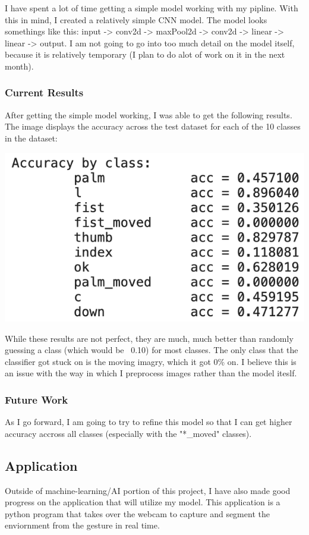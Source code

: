 \documentclass[9pt]{article}
\begin{document}
I have spent a lot of time getting a simple model working with my pipline. With this in mind, I created a relatively simple CNN model. The model looks somethings like this: input -> conv2d -> maxPool2d -> conv2d -> linear -> linear -> output. I am not going to go into too much detail on the model itself, because it is relatively temporary (I plan to do alot of work on it in the next month).

\subsubsection{Current Results}

After getting the simple model working, I was able to get the following results. The image displays the accuracy across the test dataset for each of the 10 classes in the dataset:

\includegraphics{curr_results}

While these results are not perfect, they are much, much better than randomly guessing a class (which would be ~0.10) for most classes. The only class that the classifier got stuck on is the moving imagry, which it got 0\% on. I believe this is an issue with the way in which I preprocess images rather than the model iteslf.

\subsubsection{Future Work}
As I go forward, I am going to try to refine this model so that I can get higher accuracy accross all classes (especially with the "*\_moved" classes).

\subsection{Application}
Outside of machine-learning/AI portion of this project, I have also made good progress on the application that will utilize my model. This application is a python program that takes over the webcam to capture and segment the enviornment from the gesture in real time.
\end{document}
